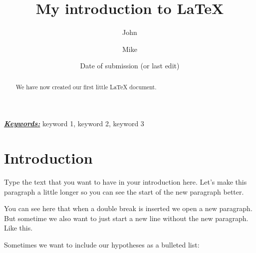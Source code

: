 \documentclass[11pt, a4paper]{article}
\title{My introduction to LaTeX}
\author[1]{John}
\author[2]{Mike}
\affil[1]{Department 1, University 1}
\affil[2]{Department 2, University 2}
\date{Date of submission (or last edit)}
\begin{document}
 
\maketitle  %
\setcounter{page}{1} %
\thispagestyle{empty} %
\pagebreak %

\begin{abstract}
We have now created our first little LaTeX document.
\end{abstract}
\par %
\textbf{\underline{\textit{Keywords:}}} keyword 1, keyword 2, keyword 3 %
\pagebreak 

\tableofcontents %


\pagebreak

\section{Introduction} %

Type the text that you want to have in your introduction here. Let's make this paragraph a little longer so you can see the start of the new paragraph better. %


You can see here that when a double break is inserted we open a new paragraph. %
But sometime we also want to just start a new line without the new paragraph.\\ %
Like this. 
\par
Sometimes we want to include our hypotheses as a bulleted list:
\end{document}
